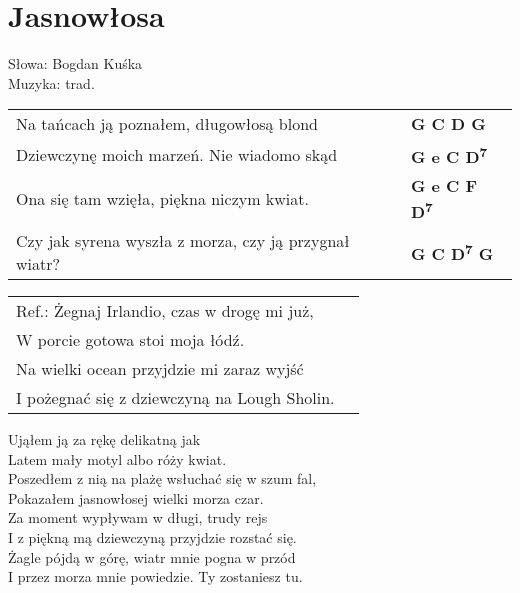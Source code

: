 \section{Jasnowłosa}

Słowa: Bogdan Kuśka\\
Muzyka:  trad.

\vspace{2em}
\begin{tabular}{@{}p{9cm}@{}l@{}}
Na tańcach ją poznałem, długowłosą blond & \bfseries  G C D G \\
Dziewczynę moich marzeń. Nie wiadomo skąd & \bfseries  G e C D\textsuperscript{7} \\
Ona się tam wzięła, piękna niczym kwiat. & \bfseries  G e C F D\textsuperscript{7} \\
Czy jak syrena wyszła z morza, czy ją przygnał wiatr? & \bfseries  G C D\textsuperscript{7} G \\
\end{tabular}

\vspace{1em}
\begin{tabular}{@{}p{9cm}@{}l@{}} \\
Ref.: Żegnaj Irlandio, czas w drogę mi już, \\
W porcie gotowa stoi moja łódź. \\
Na wielki ocean przyjdzie mi zaraz wyjść \\
I pożegnać się z dziewczyną na Lough Sholin. \\
\end{tabular}

\vspace{1em}
Ująłem ją za rękę delikatną jak \\
Latem mały motyl albo róży kwiat. \\
Poszedłem z nią na plażę wsłuchać się w szum fal, \\
Pokazałem jasnowłosej wielki morza czar. \\

Za moment wypływam w długi, trudy rejs \\
I z piękną mą dziewczyną przyjdzie rozstać się. \\
Żagle pójdą w górę, wiatr mnie pogna w przód \\
I przez morza mnie powiedzie. Ty zostaniesz tu. \\